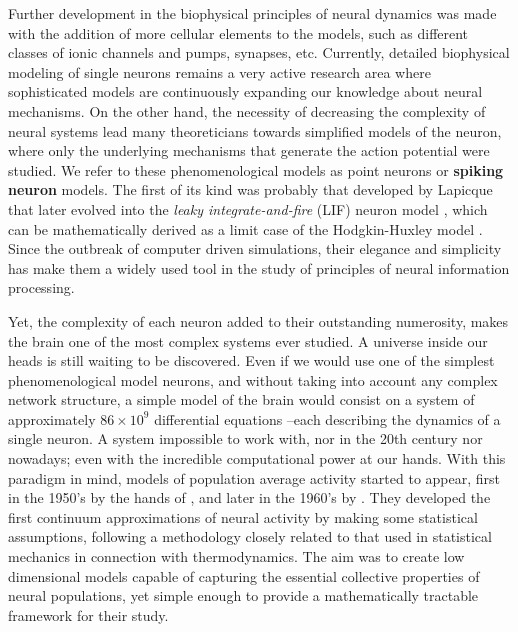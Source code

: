 Further development in the biophysical principles of neural dynamics
was made with the addition of more cellular elements to the models, such as
different classes of ionic channels and pumps, synapses,
etc. Currently, detailed biophysical modeling of single neurons
remains  a very active research area where sophisticated
models are continuously expanding our knowledge about neural
mechanisms. On the other hand, the necessity of decreasing the complexity
of neural systems lead many theoreticians towards simplified models
of the neuron, where only the underlying mechanisms that generate the
action potential were studied. We refer to these phenomenological
models as point neurons or \textbf{spiking neuron} models. The first
of its kind was probably that developed by Lapicque that
later evolved into the \textit{leaky integrate-and-fire} (LIF) neuron model
\citep{Stein1965,Kni72}, which can be mathematically 
derived as a limit case of the Hodgkin-Huxley model \citep[see~for~example][]{Gerstner2014}. Since the
outbreak of computer driven simulations, their elegance and
simplicity has make them a widely used tool in the study of
principles of neural information processing.

Yet, the complexity of each neuron added to their outstanding
numerosity,
makes the brain one of the most complex systems ever
studied. A universe inside our heads
is still waiting to be discovered.
Even if we would use one of the simplest phenomenological
model neurons, and without taking into account any
complex network structure, a simple model of the brain would consist on a system of approximately
$86\times 10^9$ differential equations --each describing the dynamics
of a single neuron. A system
impossible to work with, nor in the  20th century nor nowadays; even with
the incredible computational power at our hands. With this paradigm in
mind, models of population average activity started to appear, first
in the 1950's by the hands of \citet{Beu56}, and later in the
1960's by 
\citet{Griffith1963}. They developed the first continuum
approximations of neural activity by making some statistical
assumptions, following a methodology closely related to that used in
statistical mechanics in connection with
thermodynamics. The aim was to 
create low dimensional models capable of capturing the essential
collective properties of neural populations, yet simple enough to provide a
mathematically tractable framework for their study. 

